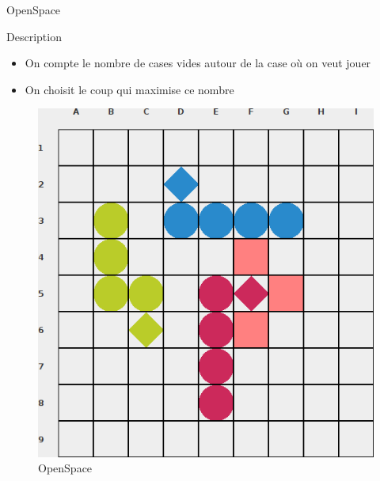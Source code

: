    \begin{frame}{OpenSpace}
        \begin{block}{Description}
            \begin{itemize}
                \item On compte le nombre de cases vides autour de la case où on veut jouer
                \item On choisit le coup qui maximise ce nombre
            \end{itemize}
            \begin{figure}
                \begin{center}
                    \includegraphics[scale=0.25]{Images/OpenSpace.png}
                    \caption{OpenSpace}
                \end{center}
            \end{figure}
        \end{block}
    \end{frame}

